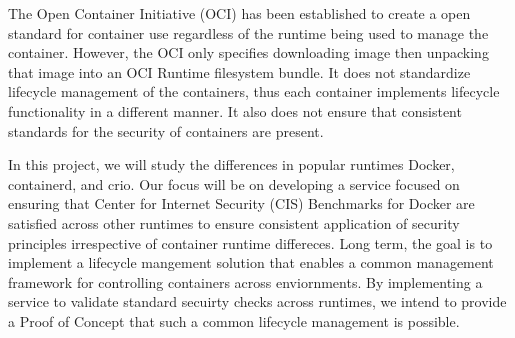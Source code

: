 The Open Container Initiative (OCI) has been established to create a open standard for container use regardless of the runtime being used to manage the container. However, the OCI only specifies downloading image then unpacking that image into an OCI Runtime filesystem bundle. It does not standardize lifecycle management of the containers, thus each container implements lifecycle functionality in a different manner. It also does not ensure that consistent standards for the security of containers are present.

In this project, we will study the differences in popular runtimes Docker, containerd, and crio. Our focus will be on developing a service focused on ensuring that Center for Internet Security (CIS) Benchmarks for Docker are satisfied across other runtimes to ensure consistent application of security principles irrespective of container runtime differeces. Long term, the goal is to implement a lifecycle mangement solution that enables a common management framework for controlling containers across enviornments. By implementing a service to validate standard secuirty checks across runtimes, we intend to provide a Proof of Concept that such a common lifecycle management is possible.